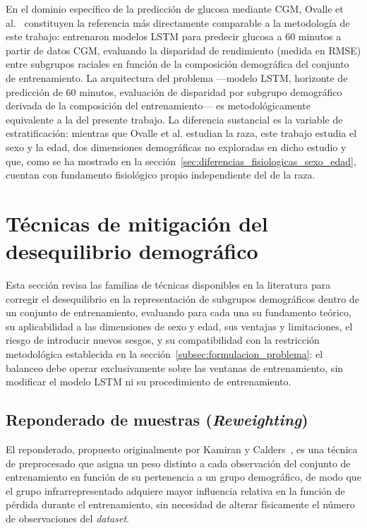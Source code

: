 En el dominio específico de la predicción de glucosa mediante CGM, Ovalle et al.~\cite{ovalle2024racial} constituyen la referencia más directamente comparable a la metodología de este trabajo: entrenaron modelos LSTM para predecir glucosa a 60 minutos a partir de datos CGM, evaluando la disparidad de rendimiento (medida en RMSE) entre subgrupos raciales en función de la composición demográfica del conjunto de entrenamiento. La arquitectura del problema —modelo LSTM, horizonte de predicción de 60 minutos, evaluación de disparidad por subgrupo demográfico derivada de la composición del entrenamiento— es metodológicamente equivalente a la del presente trabajo. La diferencia sustancial es la variable de estratificación: mientras que Ovalle et al. estudian la raza, este trabajo estudia el sexo y la edad, dos dimensiones demográficas no exploradas en dicho estudio y que, como se ha mostrado en la sección~\ref{sec:diferencias_fisiologicas_sexo_edad}, cuentan con fundamento fisiológico propio independiente del de la raza.

\section{Técnicas de mitigación del desequilibrio demográfico}
\label{sec:tecnicas_balanceo_demografico}

Esta sección revisa las familias de técnicas disponibles en la literatura para corregir el desequilibrio en la representación de subgrupos demográficos dentro de un conjunto de entrenamiento, evaluando para cada una su fundamento teórico, su aplicabilidad a las dimensiones de sexo y edad, sus ventajas y limitaciones, el riesgo de introducir nuevos sesgos, y su compatibilidad con la restricción metodológica establecida en la sección~\ref{subsec:formulacion_problema}: el balanceo debe operar exclusivamente sobre las ventanas de entrenamiento, sin modificar el modelo LSTM ni su procedimiento de entrenamiento.

\subsection{Reponderado de muestras (\emph{Reweighting})}
\label{subsec:reweighting}

El reponderado, propuesto originalmente por Kamiran y Calders~\cite{kamiran2012data}, es una técnica de preprocesado que asigna un peso distinto a cada observación del conjunto de entrenamiento en función de su pertenencia a un grupo demográfico, de modo que el grupo infrarrepresentado adquiere mayor influencia relativa en la función de pérdida durante el entrenamiento, sin necesidad de alterar físicamente el número de observaciones del \emph{dataset}.

